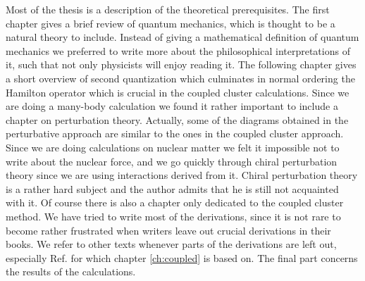 Most of the thesis is a description of the theoretical
prerequisites. The first chapter gives a brief review of quantum mechanics, 
which is thought to be a natural theory to include. Instead of giving a mathematical
definition of quantum mechanics we preferred to write more about the
philosophical interpretations of it, such that not only physicists will enjoy
reading it. The following chapter gives a short overview of second
quantization which culminates in normal ordering the Hamilton operator which is
crucial in the coupled cluster calculations.  Since we are doing  a many-body
calculation we found it rather important to include a chapter on perturbation
theory. Actually, some of the diagrams obtained in the perturbative approach are
similar to the ones in the coupled cluster approach. Since we are doing calculations
on nuclear matter we felt it impossible not to write about the nuclear force,
and we go quickly through chiral perturbation theory since we are 
using interactions derived from it. Chiral perturbation theory is a rather hard 
subject and the author admits that he is still not acquainted with it. Of course there is also a chapter only dedicated to
the coupled cluster method. We have tried to write most of the derivations, 
since it is not rare to become rather frustrated when writers
leave out crucial derivations in their books. We refer to other texts  whenever parts of the derivations are left out, especially 
Ref. \cite{sjefer} for which chapter \ref{ch:coupled} is based on.  The final part concerns the results of  the calculations.\\
\\
